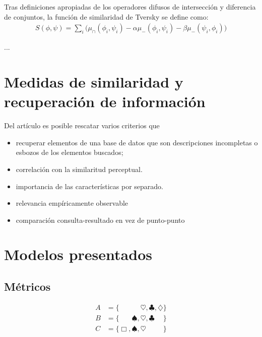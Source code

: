 \documentclass[spanish]{article}
\begin{document}
Tras definiciones apropiadas de los operadores difusos de intersección y diferencia de conjuntos,
la función de similaridad de Tversky se define como:
\begin{align}
    S(\phi, \psi) = \sum_i\bigl(\mu_\cap (\phi_i, \psi_i) -
                          \alpha\mu_-  (\phi_i, \psi_i)   -
                          \beta \mu_-  (\psi_i, \phi_i)\bigr)
\end{align}

...




\section{Medidas de similaridad y recuperación de información}
Del artículo es posible rescatar varios criterios que 


\begin{itemize}
    \item recuperar elementos de una base de datos que son descripciones
        incompletas o esbozos de los elementos buscados;
    \item correlación con la similaritud perceptual.
    \item importancia de las características por separado.
    \item relevancia empíricamente observable
    \item comparación consulta-resultado en vez de punto-punto
\end{itemize}



\section{Modelos presentados}
\subsection{Métricos}





\newcommand{\SMA}{\Box}
\newcommand{\SMB}{\spadesuit}
\newcommand{\SMC}{\heartsuit}
\newcommand{\SMD}{\clubsuit}
\newcommand{\SME}{\diamondsuit}

\begin{align*}
    A &= \{\phantom{\SMA,  \SMB,} \SMC,          \SMD,          \SME\}  \\
    B &= \{\phantom{\SMA,} \SMB,  \SMC,          \SMD\phantom{, \SME}\} \\
    C &=          \{\SMA,  \SMB,  \SMC\phantom{, \SMD,          \SME}\} \\
\end{align*}
\end{document}
